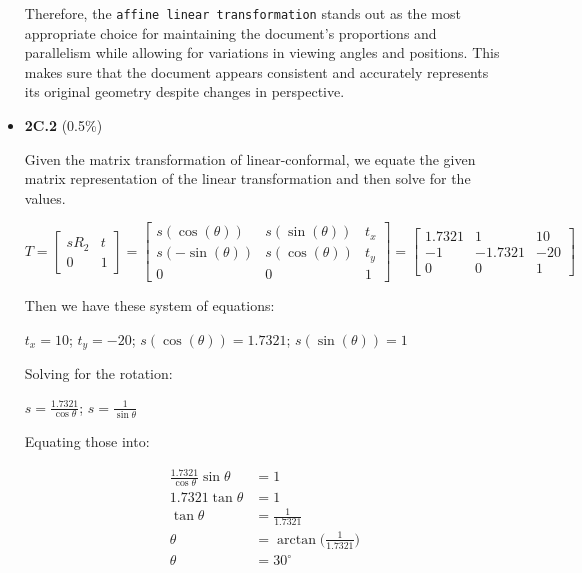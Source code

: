 \documentclass{article}
\begin{document}
\begin{itemize}
{\begin{itemize}
						Therefore, the {\texttt{affine linear transformation}} stands out as the most appropriate choice for maintaining the document's proportions and parallelism while allowing for variations in viewing angles and positions. 
						This makes sure that the document appears consistent and accurately represents its original geometry despite changes in perspective.

				\end{itemize}
			}
		
		\item{\textbf{2C.2} (0.5\%)}
			
						Given the matrix transformation of linear-conformal, we equate the given matrix representation of the linear transformation and then solve for the values.

						$
							T = \begin{bmatrix}
  									sR_2 & t \\
  									0 & 1
									\end{bmatrix}
								= \begin{bmatrix}
									s(\cos(\theta))  & s(\sin(\theta)) & t_x \\
									s(-\sin(\theta)) & s(\cos(\theta)) & t_y \\
									0 & 0 & 1
									\end{bmatrix}
								= \begin{bmatrix}
									1.7321 	& 1 		  & 10 	\\
									-1 		  & -1.7321	& -20 \\
									0       & 0       & 1
								\end{bmatrix}
						$

						Then we have these system of equations:

						$t_x = 10$; $t_y = -20$; $s(\cos(\theta)) = 1.7321$; $s(\sin(\theta)) = 1$

						Solving for the rotation:

						$s = \frac{1.7321}{\cos\theta}$; $s = \frac{1}{\sin\theta}$

						Equating those into:
						
						\begin{align*}
							\frac{1.7321}{\cos\theta}\sin\theta & = 1 \\
							1.7321\tan\theta                    & = 1 \\
							\tan\theta                          & = \frac{1}{1.7321} \\
							\theta                              & = \arctan({\frac{1}{1.7321})} \\
							\theta                              & = 30^{\circ}
						\end{align*}


\end{itemize}
\end{document}
